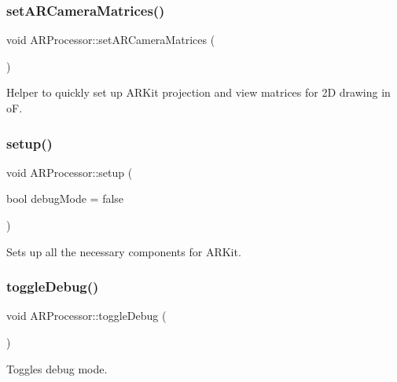 \subsubsection{\texorpdfstring{set\+A\+R\+Camera\+Matrices()}{setARCameraMatrices()}}
{\footnotesize\ttfamily void A\+R\+Processor\+::set\+A\+R\+Camera\+Matrices (\begin{DoxyParamCaption}{ }\end{DoxyParamCaption})}



Helper to quickly set up A\+R\+Kit projection and view matrices for 2D drawing in oF. 

\mbox{\label{class_a_r_processor_a1a41547daccb7c6810bc2693ea6d5487}} 
\subsubsection{\texorpdfstring{setup()}{setup()}}
{\footnotesize\ttfamily void A\+R\+Processor\+::setup (\begin{DoxyParamCaption}\item[{bool}]{debug\+Mode = {\ttfamily false} }\end{DoxyParamCaption})}



Sets up all the necessary components for A\+R\+Kit. 

\mbox{\label{class_a_r_processor_a832585774cbeb04cc181f01c193940b5}} 
\subsubsection{\texorpdfstring{toggle\+Debug()}{toggleDebug()}}
{\footnotesize\ttfamily void A\+R\+Processor\+::toggle\+Debug (\begin{DoxyParamCaption}{ }\end{DoxyParamCaption})}



Toggles debug mode. 

\mbox{\label{class_a_r_processor_a76b6cbb62dcc0aa87e38e48cc8dbe621}} 
